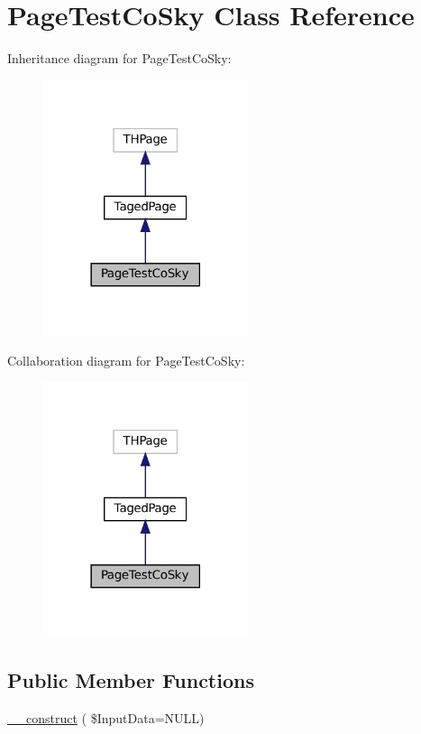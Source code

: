 \hypertarget{class_page_test_co_sky}{}\section{Page\+Test\+Co\+Sky Class Reference}
\label{class_page_test_co_sky}


Inheritance diagram for Page\+Test\+Co\+Sky\+:\nopagebreak
\begin{figure}[H]
\begin{center}
\leavevmode
\includegraphics[width=170pt]{class_page_test_co_sky__inherit__graph}
\end{center}
\end{figure}


Collaboration diagram for Page\+Test\+Co\+Sky\+:\nopagebreak
\begin{figure}[H]
\begin{center}
\leavevmode
\includegraphics[width=170pt]{class_page_test_co_sky__coll__graph}
\end{center}
\end{figure}
\subsection*{Public Member Functions}
\begin{DoxyCompactItemize}
\item 
\hyperlink{class_page_test_co_sky_a2c879f6b4c2273cb0a6e8a37e804b882}{\+\_\+\+\_\+construct} ( \$Input\+Data=N\+U\+LL)
\end{DoxyCompactItemize}
